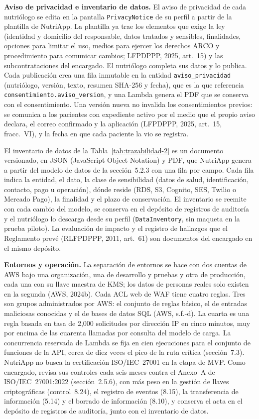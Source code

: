 \documentclass[12pt, a4paper]{article}
\begin{document}
\textbf{Aviso de privacidad e inventario de datos.} El aviso de
privacidad de cada nutriólogo se edita en la pantalla
\texttt{PrivacyNotice} de su perfil a partir de la plantilla de
NutriApp. La plantilla ya trae los elementos que exige la ley (identidad
y domicilio del responsable, datos tratados y sensibles, finalidades,
opciones para limitar el uso, medios para ejercer los derechos ARCO y
procedimiento para comunicar cambios; LFPDPPP, 2025, art.~15) y las
subcontrataciones del encargado. El nutriólogo completa sus datos y lo
publica. Cada publicación crea una fila inmutable en la entidad
\texttt{aviso\_privacidad} (nutriólogo, versión, texto, resumen SHA-256
y fecha), que es la que referencia
\texttt{consentimiento.aviso\_version}, y una Lambda genera el PDF que
se conserva con el consentimiento. Una versión nueva no invalida los
consentimientos previos: se comunica a los pacientes con expediente
activo por el medio que el propio aviso declara, el correo confirmado y
la aplicación (LFPDPPP, 2025, art.~15, fracc.~VI), y la fecha en que
cada paciente la vio se registra.

El inventario de datos de la Tabla~\ref{tab:trazabilidad-2} es un
documento versionado, en JSON (JavaScript Object Notation) y PDF, que NutriApp genera a partir del
modelo de datos de la sección~5.2.3 con una fila por campo. Cada fila
indica la entidad, el dato, la clase de sensibilidad (datos de salud,
identificación, contacto, pago u operación), dónde reside (RDS, S3,
Cognito, SES, Twilio o Mercado Pago), la finalidad y el plazo de
conservación. El inventario se reemite con cada cambio del modelo, se
conserva en el depósito de registros de auditoría y el nutriólogo lo
descarga desde su perfil (\texttt{DataInventory}, sin maqueta en la
prueba piloto). La evaluación de impacto y el registro de hallazgos que
el Reglamento prevé (RLFPDPPP, 2011, art.~61) son documentos del
encargado en el mismo depósito.
 
\textbf{Entornos y operación.} La separación de entornos se hace con dos
cuentas de AWS bajo una organización, una de desarrollo y pruebas y otra
de producción, cada una con su llave maestra de KMS; los datos de
personas reales solo existen en la segunda (AWS, 2024b). Cada ACL web de
WAF tiene cuatro reglas. Tres son grupos administrados por AWS: el
conjunto de reglas básico, el de entradas maliciosas conocidas y el de
bases de datos SQL (AWS, s.f.-d). La cuarta es una regla basada en tasa
de 2,000 solicitudes por dirección IP en cinco minutos, muy por encima
de las cuarenta llamadas por consulta del modelo de carga. La
concurrencia reservada de Lambda se fija en cien ejecuciones para el
conjunto de funciones de la API, cerca de diez veces el pico de la ruta
crítica (sección~7.3). NutriApp no busca la certificación ISO/IEC~27001 en la etapa de MVP. Como encargado, revisa sus controles
cada seis meses contra el Anexo~A de ISO/IEC~27001:2022 (sección~2.5.6), con más peso en la gestión de llaves criptográficas (control~8.24), el registro de eventos (8.15), la transferencia de información (5.14) y el borrado de información (8.10),
y conserva el acta en el depósito de registros de auditoría, junto con
el inventario de datos.
 
\end{document}
